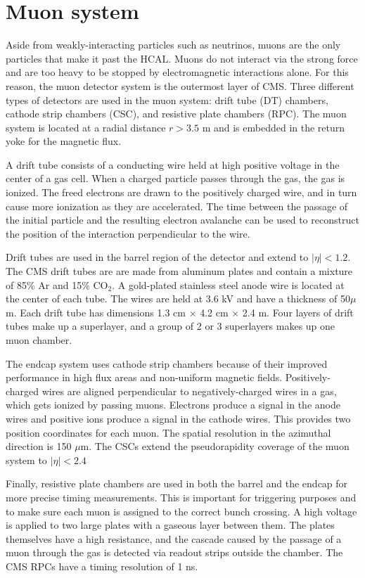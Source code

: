 
\section{Muon system}
\label{sec:Muon}
Aside from weakly-interacting particles such as neutrinos, muons are the only particles that make it past the HCAL. Muons do not interact via the strong force and are too heavy to be stopped by electromagnetic interactions alone. For this reason, the muon detector system is the outermost layer of CMS. Three different types of detectors are used in the muon system: drift tube (DT) chambers, cathode strip chambers (CSC), and resistive plate chambers (RPC). The muon system is located at a radial distance $r > 3.5$ m and is embedded in the return yoke for the magnetic flux.

A drift tube consists of a conducting wire held at high positive voltage in the center of a gas cell. When a charged particle passes through the gas, the gas is ionized. The freed electrons are drawn to the positively charged wire, and in turn cause more ionization as they are accelerated. The time between the passage of the initial particle and the resulting electron avalanche can be used to reconstruct the position of the interaction perpendicular to the wire.

Drift tubes are used in the barrel region of the detector and extend to $|\eta| < 1.2$. The CMS drift tubes are are made from aluminum plates and contain a mixture of 85\% Ar and 15\% CO$_2$. A gold-plated stainless steel anode wire is located at the center of each tube. The wires are held at 3.6 kV and have a thickness of 50$\mu$m. Each drift tube has dimensions 1.3 cm $\times$ 4.2 cm $\times$ 2.4 m. Four layers of drift tubes make up a superlayer, and a group of 2 or 3 superlayers makes up one muon chamber.

The endcap system uses cathode strip chambers because of their improved performance in high flux areas and non-uniform magnetic fields. Positively-charged wires are aligned perpendicular to negatively-charged wires in a gas, which gets ionized by passing muons. Electrons produce a signal in the anode wires and positive ions produce a signal in the cathode wires. This provides two position coordinates for each muon. The spatial resolution in the azimuthal direction is 150 $\mu$m. The CSCs extend the pseudorapidity coverage of the muon system to $|\eta| < 2.4$

Finally, resistive plate chambers are used in both the barrel and the endcap for more precise timing measurements. This is important for triggering purposes and to make sure each muon is assigned to the correct bunch crossing. A high voltage is applied to two large plates with a gaseous layer between them. The plates themselves have a high resistance, and the cascade caused by the passage of a muon through the gas is detected via readout strips outside the chamber. The CMS RPCs have a timing resolution of 1 ns. 

